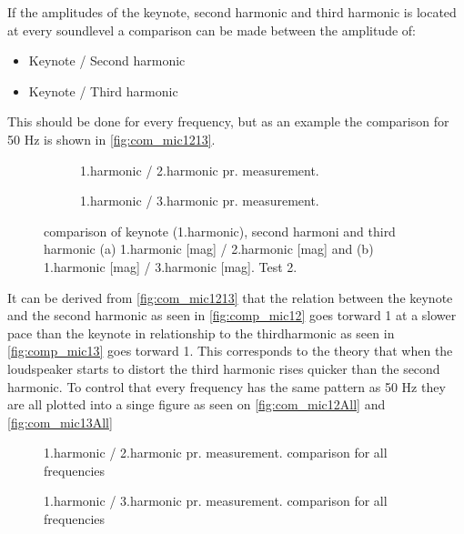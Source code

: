 If the amplitudes of the keynote, second harmonic and third harmonic is located at every soundlevel a comparison can be made between the amplitude of:
\begin{itemize}
\item Keynote / Second harmonic
\item Keynote / Third harmonic
\end{itemize}
This should be done for every frequency, but as an example the comparison for 50 Hz is shown in \autoref{fig:com_mic1213}.

\begin{figure}[H]
\centering
\begin{subfigure}[t]{0.45\textwidth}
    
    \caption{1.harmonic / 2.harmonic pr. measurement.}
    \label{fig:comp_mic12}
\end{subfigure}
\begin{subfigure}[t]{0.45\textwidth}
    
    \caption{1.harmonic / 3.harmonic pr. measurement.}
    \label{fig:comp_mic13}
\end{subfigure}
\caption{comparison of keynote (1.harmonic), second harmoni and third harmonic (a) 1.harmonic [mag] / 2.harmonic [mag] and (b) 1.harmonic [mag] / 3.harmonic [mag]. Test 2.}
\label{fig:com_mic1213}
\end{figure}   

It can be derived from \autoref{fig:com_mic1213} that the relation between the keynote and the second harmonic as seen in \autoref{fig:comp_mic12} goes torward 1 at a slower pace than the keynote in relationship to the thirdharmonic as seen in \autoref{fig:comp_mic13} goes torward 1. This corresponds to the theory that when the loudspeaker starts to distort the third harmonic rises quicker than the second harmonic. To control that every frequency has the same pattern as 50 Hz they are all plotted into a singe figure as seen on \autoref{fig:com_mic12All} and \autoref{fig:com_mic13All}

\begin{figure}[H]
    \centering
    
    \caption{1.harmonic / 2.harmonic pr. measurement. comparison for all frequencies}
\label{fig:com_mic12All}
\end{figure}   
\begin{figure}[H]
    \centering
    
    \caption{1.harmonic / 3.harmonic pr. measurement. comparison for all frequencies}
\label{fig:com_mic13All}
\end{figure}  

